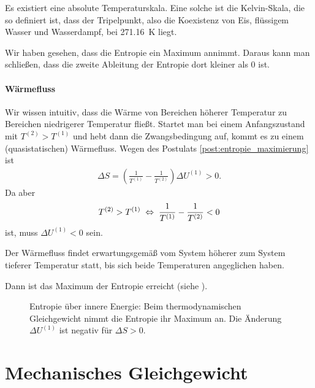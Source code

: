 \begin{formal}
    Es existiert eine absolute Temperaturskala. Eine solche ist die Kelvin-Skala, die so definiert ist, dass der Tripelpunkt, also die Koexistenz von Eis, flüssigem Wasser und Wasserdampf, bei \qty{271,16}{\kelvin} liegt.
\end{formal}

Wir haben gesehen, dass die Entropie ein Maximum annimmt. Daraus kann man schließen, dass die zweite Ableitung der Entropie dort kleiner als $0$ ist.

\paragraph*{Wärmefluss}

Wir wissen intuitiv, dass die Wärme von Bereichen höherer Temperatur zu Bereichen niedrigerer Temperatur fließt. Startet man bei einem Anfangszustand mit $T^{(2)}> T^{(1)}$ und hebt dann die Zwangsbedingung auf, kommt es zu einem (quasistatischen) Wärmefluss.
Wegen des Postulats \ref{post:entropie_maximierung} ist
\begin{align*}
    \Delta S= \left(\frac{1}{T^{(1)}}-\frac{1}{T^{(2)}}\right)\Delta U^{(1)} > 0.
\end{align*}
Da aber
\begin{align*}
    T^{(2)}> T^{(1)} \;\Leftrightarrow\; \frac{1}{T^{(1)}}-\frac{1}{T^{(2)}} < 0
\end{align*}
ist, muss $\Delta U^{(1)} <0$ sein.
\begin{formal}
    Der Wärmefluss findet erwartungsgemäß vom System höherer zum System tieferer Temperatur statt, bis sich beide Temperaturen angeglichen haben.
\end{formal}
Dann ist das Maximum der Entropie erreicht (siehe ).

\begin{figure}[htbp]
    \centering
    \tfigFunktionEntropieMaximum
    \caption{Entropie über innere Energie: Beim thermodynamischen Gleichgewicht nimmt die Entropie ihr Maximum an. Die Änderung $\Delta U^{(1)}$ ist negativ für $\Delta S>0$. }
    \label{fig:FunktionEntropieMaximum}
\end{figure}




\section{Mechanisches Gleichgewicht}


